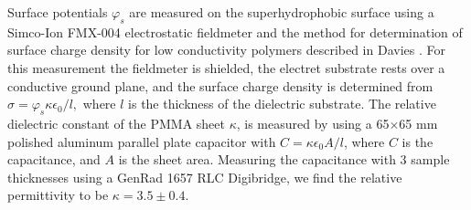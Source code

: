 \documentclass[aip,reprint, floatfix]{revtex4-1}
\begin{document}
Surface potentials $\varphi_s$ are measured on the superhydrophobic surface using a Simco-Ion FMX-004 electrostatic fieldmeter and the method for determination of surface charge density for low conductivity polymers described in Davies \cite{davies_examination_1967}. For this measurement the fieldmeter is shielded, the electret substrate rests over a conductive ground plane, and the surface charge density is determined from $\sigma = \varphi_s \kappa \epsilon_0/l,$ where $l$ is the thickness of the dielectric substrate. The relative dielectric constant of the PMMA sheet $\kappa$, is measured by using a 65$\times$65 mm polished aluminum parallel plate capacitor with $C = \kappa \epsilon_0 A/l$, where $C$ is the capacitance, and $A$ is the sheet area. Measuring the capacitance with 3 sample thicknesses using a GenRad 1657 RLC Digibridge, we find the relative permittivity to be $\kappa = 3.5 \pm 0.4$.  
\end{document}

